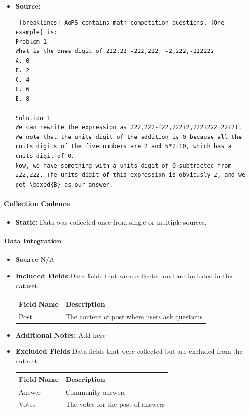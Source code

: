 \begin{itemize}
\item \textbf{Source:} \begin{lstlisting} [breaklines] AoPS contains math competition questions. [One example] is:
Problem 1
What is the ones digit of 222,22 -222,222, -2,222,-222222 
A. 0
B. 2
C. 4
D. 6
E. 8      

Solution 1
We can rewrite the expression as 222,222-(22,222+2,222+222+22+2).
We note that the units digit of the addition is 0 because all the units digits of the five numbers are 2 and 5*2=10, which has a units digit of 0.
Now, we have something with a units digit of 0 subtracted from 222,222. The units digit of this expression is obviously 2, and we get \boxed{B} as our answer.
\end{lstlisting}
\end{itemize}

\paragraph{Collection Cadence}
\begin{itemize}
\item \textbf{Static:} Data was collected once from single or multiple sources.
\end{itemize}

\paragraph{Data Integration}
\begin{itemize}
\item \textbf{Source} N/A

\item \textbf{Included Fields} Data fields that were collected and are included in the dataset.

\begin{tabular}{|l|l|}
\hline
Field Name & Description \\
\hline
Post & The content of post where users ask questions \\
\hline
\end{tabular}

\item  \textbf{Additional Notes:} Add here

\item  \textbf{Excluded Fields} Data fields that were collected but are excluded from the dataset.

\begin{tabular}{|l|l|}
\hline
Field Name & Description \\
\hline
Answer & Community answers \\
Votes & The votes for the post of answers \\
\hline
\end{tabular}
\end{itemize}

